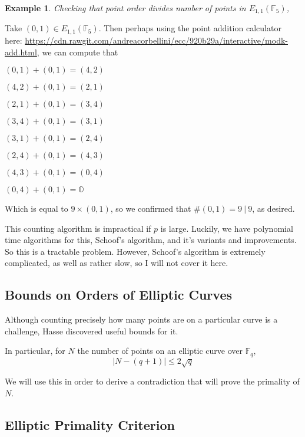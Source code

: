 \documentclass[]{article}
\newtheorem{benexample}{Example}
\newcommand{\OS}{\mathbb{O}}
\newcommand{\F}{\mathbb{F}}
\begin{document}
\begin{tcolorbox}[breakable,
	enhanced,
	standard jigsaw,
	opacityback=0]

	\noindent \begin{benexample}
		Checking that point order divides number of points in $E_{1,1}(\F_5)$,
	\end{benexample}

	\noindent Take $(0,1) \in E_{1,1}(\F_5)$. Then perhaps using the point addition calculator here: \url{https://cdn.rawgit.com/andreacorbellini/ecc/920b29a/interactive/modk-add.html}, we can compute that

	\noindent $(0,1)+(0,1) = (4,2)$

	\noindent $(4,2)+(0,1) = (2,1)$

	\noindent $(2,1)+(0,1) = (3,4)$

	\noindent $(3,4)+(0,1) = (3,1)$

	\noindent $(3,1)+(0,1) = (2,4)$

	\noindent $(2,4)+(0,1) = (4,3)$

	\noindent $(4,3)+(0,1) = (0,4)$

	\noindent $(0,4)+(0,1) = \OS$


	\noindent Which is equal to $9 \times (0,1)$, so we confirmed that $\# (0,1) = 9\ |\ 9$, as desired.

\end{tcolorbox}

This counting algorithm is impractical if $p$ is large. Luckily, we have polynomial time algorithms for this, Schoof's algorithm, and it's variants and improvements. So this is a tractable problem. However, Schoof's algorithm is extremely complicated, as well as rather slow, so I will not cover it here.

\subsection{Bounds on Orders of Elliptic Curves}

Although counting precisely how many points are on a particular curve is a challenge, Hasse discovered useful bounds for it.

In particular, for $N$ the number of points on an elliptic curve over $\F_q$,
$$|N-(q+1)| \le 2\sqrt{q}$$

We will use this in order to derive a contradiction that will prove the primality of $N$.

\subsection{Elliptic Primality Criterion}
\end{document}
